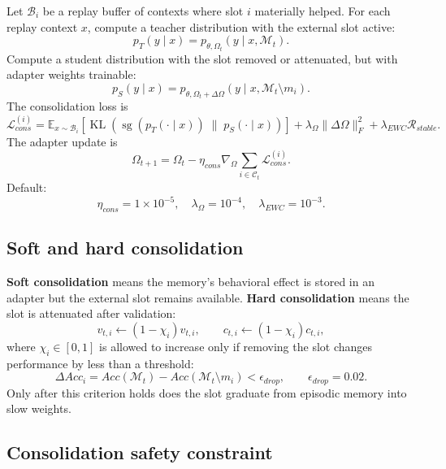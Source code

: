 \documentclass[11pt]{article}
\newcommand{\E}{\mathbb{E}}
\newcommand{\sg}{\operatorname{sg}}
\newcommand{\KL}{\operatorname{KL}}
\newcommand{\Mem}{\mathcal{M}}
\begin{document}
Let \(\mathcal{B}_i\) be a replay buffer of contexts where slot \(i\) materially helped. For each replay context \(x\), compute a teacher distribution with the external slot active:
\begin{equation}
    p_T(y\mid x)=p_{\theta,\Omega_t}(y\mid x,\Mem_t).
\end{equation}
Compute a student distribution with the slot removed or attenuated, but with adapter weights trainable:
\begin{equation}
    p_S(y\mid x)=p_{\theta,\Omega_t+\Delta\Omega}(y\mid x,\Mem_t\setminus m_i).
\end{equation}
The consolidation loss is
\begin{equation}
    \mathcal{L}_{cons}^{(i)}=\E_{x\sim\mathcal{B}_i}\left[\KL\left(\sg(p_T(\cdot\mid x))\;\|\;p_S(\cdot\mid x)\right)\right]+\lambda_\Omega\|\Delta\Omega\|_F^2+\lambda_{EWC}\mathcal{R}_{stable}.
\end{equation}
The adapter update is
\begin{equation}
    \Omega_{t+1}=\Omega_t-\eta_{cons}\nabla_{\Omega}\sum_{i\in\mathcal{C}_t}\mathcal{L}_{cons}^{(i)}.
\end{equation}
Default:
\begin{equation}
    \eta_{cons}=1\times10^{-5},\quad \lambda_\Omega=10^{-4},\quad \lambda_{EWC}=10^{-3}.
\end{equation}

\subsection{Soft and hard consolidation}

\textbf{Soft consolidation} means the memory's behavioral effect is stored in an adapter but the external slot remains available. \textbf{Hard consolidation} means the slot is attenuated after validation:
\begin{equation}
    v_{t,i}\leftarrow (1-\chi_i)v_{t,i},\qquad c_{t,i}\leftarrow (1-\chi_i)c_{t,i},
\end{equation}
where \(\chi_i\in[0,1]\) is allowed to increase only if removing the slot changes performance by less than a threshold:
\begin{equation}
    \Delta Acc_i = Acc(\Mem_t)-Acc(\Mem_t\setminus m_i)<\epsilon_{drop}, \qquad \epsilon_{drop}=0.02.
\end{equation}
Only after this criterion holds does the slot graduate from episodic memory into slow weights.

\subsection{Consolidation safety constraint}
\end{document}
